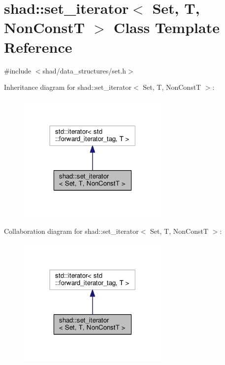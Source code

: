 \hypertarget{classshad_1_1set__iterator}{\section{shad\-:\-:set\-\_\-iterator$<$ Set, T, Non\-Const\-T $>$ Class Template Reference}
\label{classshad_1_1set__iterator}
}


{\ttfamily \#include $<$shad/data\-\_\-structures/set.\-h$>$}



Inheritance diagram for shad\-:\-:set\-\_\-iterator$<$ Set, T, Non\-Const\-T $>$\-:
\nopagebreak
\begin{figure}[H]
\begin{center}
\leavevmode
\includegraphics[width=210pt]{classshad_1_1set__iterator__inherit__graph}
\end{center}
\end{figure}


Collaboration diagram for shad\-:\-:set\-\_\-iterator$<$ Set, T, Non\-Const\-T $>$\-:
\nopagebreak
\begin{figure}[H]
\begin{center}
\leavevmode
\includegraphics[width=210pt]{classshad_1_1set__iterator__coll__graph}
\end{center}
\end{figure}
